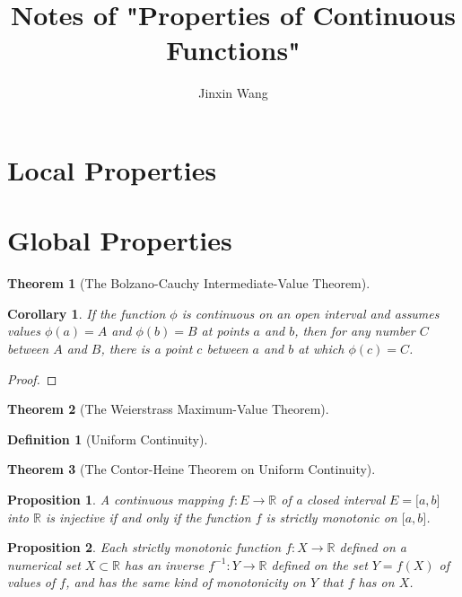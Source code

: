 \documentclass[onecolumn]{ctexart}
\title{Notes of "Properties of Continuous Functions"}
\author{Jinxin Wang}
\date{}
\newtheorem{definition}{Definition}
\newtheorem{theorem}{Theorem}
\newtheorem{proposition}{Proposition}
\newtheorem{corollary}{Corollary}
\begin{document}
\maketitle

\section{Local Properties}

\section{Global Properties}

\begin{theorem}[The Bolzano-Cauchy Intermediate-Value Theorem]
  
\end{theorem}

\begin{corollary}
  If the function $\phi$ is continuous on an open interval and assumes values 
  $\phi(a) = A$ and $\phi(b) = B$ at points $a$ and $b$, then for any number $C$ 
  between $A$ and $B$, there is a point $c$ between $a$ and $b$ at which 
  $\phi(c) = C$.
\end{corollary}
\begin{proof}
  
\end{proof}

\begin{theorem}[The Weierstrass Maximum-Value Theorem]
  
\end{theorem}

\begin{definition}[Uniform Continuity]
  
\end{definition}

\begin{theorem}[The Contor-Heine Theorem on Uniform Continuity]
  
\end{theorem}

\begin{proposition}
  A continuous mapping $f:E \to \mathbb{R}$ of a closed interval 
  $E = \lbrack a,b \rbrack$ into $\mathbb{R}$ is injective if and only if the 
  function $f$ is strictly monotonic on $\lbrack a,b \rbrack$.
\end{proposition}

\begin{proposition}
  Each strictly monotonic function $f:X \to \mathbb{R}$ defined on a numerical 
  set $X \subset \mathbb{R}$ has an inverse $f^{-1}:Y \to \mathbb{R}$ defined on 
  the set $Y = f(X)$ of values of $f$, and has the same kind of monotonicity on 
  $Y$ that $f$ has on $X$.
\end{proposition}
\end{document}

